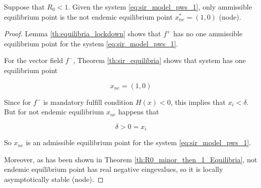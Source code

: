 \begin{theorem}
Suppose that $R_0 < 1$. Given the system \ref{eq:sir_model_pws_1}, only ammissible equilibrium point is the not endemic equilibrium point $x_{ne}^*=(1,0)$ (node).
\end{theorem}

\begin{proof}
Lemma \ref{th:equilibria_lockdown} shows that $f^+$ has no one ammissible equilibrium point for the system \ref{eq:sir_model_pws_1}.

For the vector field $f^-$, Theorem \ref{th:sir_equilibria} shows that system has one equilibrium point

\begin{equation}
    x_{ne} = (1,0)
\end{equation}

Since for $f^-$ is mandatory fulfill condition $H(x) < 0$, this implies that $x_i < \delta$. But for not endemic equilibrium $x_{ne}$ happens that

\begin{equation}
    \delta > 0 = x_i
\end{equation}

So $x_{ne}$ is an admissible equilibrium point for the system \ref{eq:sir_model_pws_1}.

Moreover, as has been shown in Theorem \ref{th:R0_minor_then_1_Equilibria}, not endemic equilibrium point has real negative eingevalues, so it is locally asymptotically stable (node).
\end{proof}